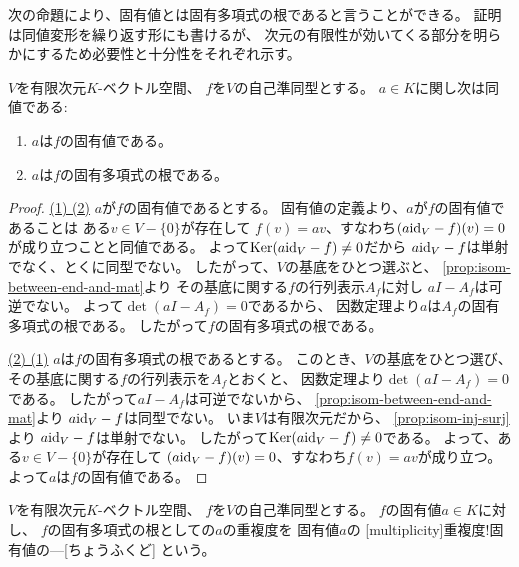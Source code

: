 \documentclass[report]{jlreq}
\begin{document}
次の命題により、固有値とは固有多項式の根であると言うことができる。
証明は同値変形を繰り返す形にも書けるが、
次元の有限性が効いてくる部分を明らかにするため必要性と十分性をそれぞれ示す。

\begin{proposition}[固有値と固有多項式の関係]
    $V$を有限次元$K$-ベクトル空間、
    $f$を$V$の自己準同型とする。
    $a \in K$に関し次は同値である:
    \begin{enumerate}
        \item $a$は$f$の固有値である。
        \item $a$は$f$の固有多項式の根である。
    \end{enumerate}
\end{proposition}

\begin{proof}
    \uline{(1) \Rightarrow (2)} \quad
    $a$が$f$の固有値であるとする。
    固有値の定義より、$a$が$f$の固有値であることは
    ある$v \in V - \{ 0 \}$が存在して
    $f(v) = av$、すなわち$(a \mathrm{id}_V - f)(v) = 0$が成り立つことと同値である。
    よって$\operatorname{\mathrm{Ker}} (a \mathrm{id}_V - f) \neq 0$だから
    $a \mathrm{id}_V - f$は単射でなく、とくに同型でない。
    したがって、$V$の基底をひとつ選ぶと、
    \cref{prop:isom-between-end-and-mat}より
    その基底に関する$f$の行列表示$A_f$に対し
    $aI - A_f$は可逆でない。
    よって$\det (aI - A_f) = 0$であるから、
    因数定理より$a$は$A_f$の固有多項式の根である。
    したがって$f$の固有多項式の根である。

    \uline{(2) \Rightarrow (1)} \quad
    $a$は$f$の固有多項式の根であるとする。
    このとき、$V$の基底をひとつ選び、
    その基底に関する$f$の行列表示を$A_f$とおくと、
    因数定理より$\det (aI - A_f) = 0$である。
    したがって$aI - A_f$は可逆でないから、
    \cref{prop:isom-between-end-and-mat}より
    $a \mathrm{id}_V - f$は同型でない。
    いま$V$は有限次元だから、
    \cref{prop:isom-inj-surj}より
    $a \mathrm{id}_V - f$は単射でない。
    したがって$\operatorname{\mathrm{Ker}} (a \mathrm{id}_V - f) \neq 0$である。
    よって、ある$v \in V - \{ 0 \}$が存在して
    $(a \mathrm{id}_V - f)(v) = 0$、すなわち$f(v) = av$が成り立つ。
    よって$a$は$f$の固有値である。
\end{proof}

\begin{definition}[固有値の重複度]
    $V$を有限次元$K$-ベクトル空間、
    $f$を$V$の自己準同型とする。
    $f$の固有値$a \in K$に対し、
    $f$の固有多項式の根としての$a$の重複度を
    固有値$a$の
    [multiplicity]{重複度!固有値の---}[ちょうふくど]
    という。
\end{definition}
\end{document}
